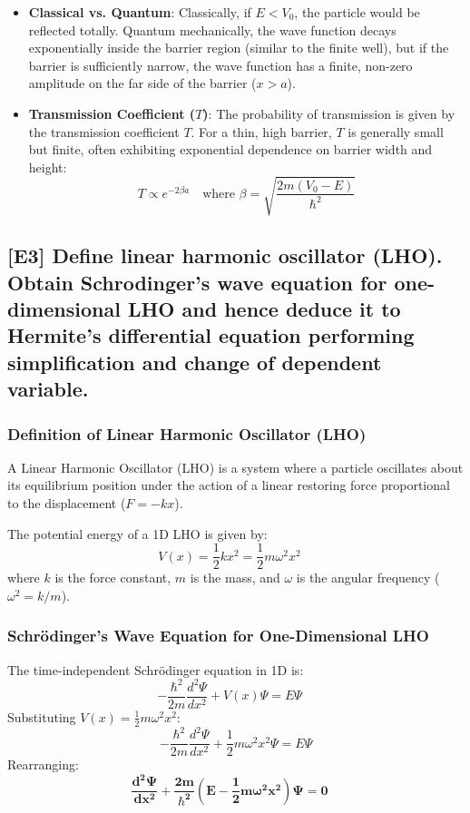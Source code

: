 \documentclass[12pt]{article}
\begin{document}
\begin{itemize}
    \item \textbf{Classical vs. Quantum}: Classically, if $E < V_0$, the particle would be reflected totally. Quantum mechanically, the wave function decays exponentially inside the barrier region (similar to the finite well), but if the barrier is sufficiently narrow, the wave function has a finite, non-zero amplitude on the far side of the barrier ($x > a$).
    \item \textbf{Transmission Coefficient ($T$)}: The probability of transmission is given by the transmission coefficient $T$. For a thin, high barrier, $T$ is generally small but finite, often exhibiting exponential dependence on barrier width and height:
    $$
    T \propto e^{-2\beta a} \quad \text{where } \beta = \sqrt{\frac{2m (V_0 - E)}{\hbar^2}}
    $$
\end{itemize}

\subsection{[E3] Define linear harmonic oscillator (LHO). Obtain Schrodinger’s wave equation for one-dimensional LHO and hence deduce it to Hermite’s differential equation performing simplification and change of dependent variable.}

\subsubsection*{Definition of Linear Harmonic Oscillator (LHO)}
A Linear Harmonic Oscillator (LHO) is a system where a particle oscillates about its equilibrium position under the action of a linear restoring force proportional to the displacement ($F = -kx$).

The potential energy of a 1D LHO is given by:
$$
V(x) = \frac{1}{2} k x^2 = \frac{1}{2} m \omega^2 x^2 \quad \text{}
$$
where $k$ is the force constant, $m$ is the mass, and $\omega$ is the angular frequency ($\omega^2 = k/m$).

\subsubsection*{Schrödinger’s Wave Equation for One-Dimensional LHO}
The time-independent Schrödinger equation in 1D is:
$$
-\frac{\hbar^2}{2m} \frac{d^2\Psi}{dx^2} + V(x)\Psi = E\Psi \quad \text{}
$$
Substituting $V(x) = \frac{1}{2} m \omega^2 x^2$:
$$
-\frac{\hbar^2}{2m} \frac{d^2\Psi}{dx^2} + \frac{1}{2} m \omega^2 x^2 \Psi = E\Psi
$$
Rearranging:
$$
\mathbf{\frac{d^2\Psi}{dx^2} + \frac{2m}{\hbar^2} \left(E - \frac{1}{2} m \omega^2 x^2\right) \Psi = 0} \quad \text{}
$$
\end{document}
